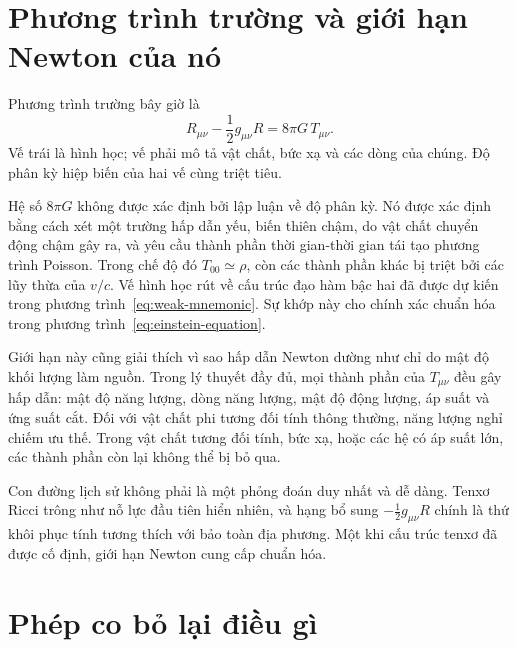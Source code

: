 \section{Phương trình trường và giới hạn Newton của nó}

Phương trình trường bây giờ là
\begin{equation}
 \boxed{
 R_{\mu\nu}-\frac12 g_{\mu\nu}R
 =
 8\pi G\,T_{\mu\nu}
 }.
 \label{eq:einstein-equation}
\end{equation}
Vế trái là hình học; vế phải mô tả vật chất, bức xạ và các dòng của chúng. Độ phân kỳ hiệp biến của hai vế cùng triệt tiêu.

Hệ số \(8\pi G\) không được xác định bởi lập luận về độ phân kỳ. Nó được xác định bằng cách xét một trường hấp dẫn yếu, biến thiên chậm, do vật chất chuyển động chậm gây ra, và yêu cầu thành phần thời gian-thời gian tái tạo phương trình Poisson. Trong chế độ đó \(T_{00}\simeq\rho\), còn các thành phần khác bị triệt bởi các lũy thừa của \(v/c\). Vế hình học rút về cấu trúc đạo hàm bậc hai đã được dự kiến trong phương trình~\eqref{eq:weak-mnemonic}. Sự khớp này cho chính xác chuẩn hóa trong phương trình~\eqref{eq:einstein-equation}.

Giới hạn này cũng giải thích vì sao hấp dẫn Newton dường như chỉ do mật độ khối lượng làm nguồn. Trong lý thuyết đầy đủ, mọi thành phần của \(T_{\mu\nu}\) đều gây hấp dẫn: mật độ năng lượng, dòng năng lượng, mật độ động lượng, áp suất và ứng suất cắt. Đối với vật chất phi tương đối tính thông thường, năng lượng nghỉ chiếm ưu thế. Trong vật chất tương đối tính, bức xạ, hoặc các hệ có áp suất lớn, các thành phần còn lại không thể bị bỏ qua.

Con đường lịch sử không phải là một phỏng đoán duy nhất và dễ dàng. Tenxơ Ricci trông như nỗ lực đầu tiên hiển nhiên, và hạng bổ sung \(-\tfrac12g_{\mu\nu}R\) chính là thứ khôi phục tính tương thích với bảo toàn địa phương. Một khi cấu trúc tenxơ đã được cố định, giới hạn Newton cung cấp chuẩn hóa.

\section{Phép co bỏ lại điều gì}

\begin{classroomqa}
\end{classroomqa}

